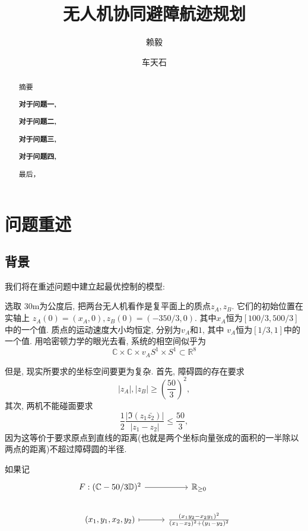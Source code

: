 \documentclass[withoutpreface,bwprint]{cumcmthesis}
\title{无人机协同避障航迹规划}  %
\author{赖毅}
\author{车天石}
\begin{document}
\maketitle
\begin{abstract}
摘要

\textbf{对于问题一,}

\textbf{对于问题二,}

\textbf{对于问题三,}

\textbf{对于问题四,}

最后，



\end{abstract}
\section{问题重述}
\subsection{背景}
我们将在重述问题中建立起最优控制的模型:

选取 30m为公度后, 把两台无人机看作是复平面上的质点$z_A,z_B$. 它们的初始位置在实轴上 $z_A(0)=(x_A,0), z_B(0)=(-350/3,0).$ 其中$x_A$恒为$[100/3,500/3]$中的一个值. 质点的运动速度大小均恒定, 分别为$v_A$和$1$, 其中 $v_A$恒为$[1/3,1]$中的一个值. 用哈密顿力学的眼光去看, 系统的相空间似乎为 $$\mathbb{C}\times \mathbb{C} \times v_A S^1 \times S^1 \subset \mathbb{R}^8$$

但是, 现实所要求的坐标空间要更为复杂. 首先, 障碍圆的存在要求 \[ |z_A|,|z_B| \geq (\frac{50}{3})^2, \] 其次, 两机不能碰面要求 \[ \frac{1}{2}\frac{|\Im(z_1\bar{z_2})|}{|z_1-z_2|} \leq \frac{50}{3}, \] 因为这等价于要求原点到直线的距离(也就是两个坐标向量张成的面积的一半除以两点的距离)不超过障碍圆的半径.

如果记 
\[\begin{tikzcd}
	{F:(\mathbb{C}-50/3\mathbb{D})^2} & {\mathbb{R}_{\geq 0}} \\
	{(x_1,y_1,x_2,y_2)} & {\frac{(x_1y_2-x_2y_1)^2}{(x_1-x_2)^2+(y_1-y_2)^2}}
	\arrow[from=1-1, to=1-2]
	\arrow[maps to, from=2-1, to=2-2]
\end{tikzcd}\]
\end{document}
